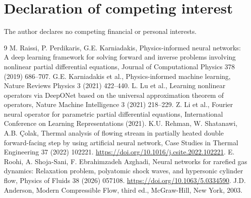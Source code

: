 \documentclass[11pt]{article}
\newenvironment{revision}{\color{revisionblue}}{}
\newenvironment{revision}{}{}
\begin{document}
\begin{revision}
\section*{Declaration of competing interest}
The author declares no competing financial or personal interests.

\begin{thebibliography}{9}
 M. Raissi, P. Perdikaris, G.E. Karniadakis, Physics-informed neural networks: A deep learning framework for solving forward and inverse problems involving nonlinear partial differential equations, Journal of Computational Physics 378 (2019) 686--707.
 G.E. Karniadakis et al., Physics-informed machine learning, Nature Reviews Physics 3 (2021) 422--440.
 L. Lu et al., Learning nonlinear operators via DeepONet based on the universal approximation theorem of operators, Nature Machine Intelligence 3 (2021) 218--229.
 Z. Li et al., Fourier neural operator for parametric partial differential equations, International Conference on Learning Representations (2021).
 K.U. Rehman, W. Shatanawi, A.B. \c{C}olak, Thermal analysis of flowing stream in partially heated double forward-facing step by using artificial neural network, Case Studies in Thermal Engineering 37 (2022) 102221. \url{https://doi.org/10.1016/j.csite.2022.102221}.
 E. Roohi, A. Shoja-Sani, F. Ebrahimzadeh Azghadi, Neural networks for rarefied gas dynamics: Relaxation problem, polyatomic shock waves, and hypersonic cylinder flow, Physics of Fluids 38 (2026) 057108. \url{https://doi.org/10.1063/5.0334590}.
 J.D. Anderson, Modern Compressible Flow, third ed., McGraw-Hill, New York, 2003.
\end{thebibliography}
\end{revision}
\end{document}
